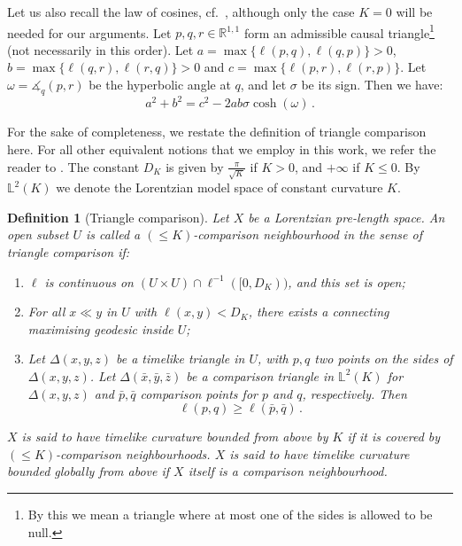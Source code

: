 \documentclass[hidelinks,12pt,a4paper]{article}
\numberwithin{equation}{section}
\theoremstyle{plain}
\newtheorem{definition}{Definition}[section]
\theoremstyle{definition}
\newcommand{\lm}[1]{\mathbb{L}^2(#1)}
\newcommand{\LpLSn}{Lo\-rentz\-ian pre-length space}
\newcommand{\ma}{\ensuremath{\measuredangle}}
\begin{document}
Let us also recall the law of cosines, cf.\ \cite[Lemma 2.4]{BS23}, although only the case $K=0$ will be needed for our arguments.  
Let $p, q, r \in \mathbb{R}^{1,1}$ form an admissible causal triangle\footnote{By this we mean a triangle where at most one of the sides is allowed to be null. } (not necessarily in this order). 
Let $a = \max\{\ell (p, q), \ell (q, p)\} > 0$, $b = \max\{\ell (q, r), \ell (r, q)\} > 0$ and $c = \max \{\ell (p, r), \ell (r, p)\}$. 
Let $\omega=\ma_q(p,r)$ be the hyperbolic angle at $q$, and let $\sigma$ be its sign. 
Then we have: 
\begin{equation}
\label{eq: LOC}
a^2 + b^2 = c^2 - 2ab\sigma \cosh(\omega) \, .
\end{equation}

For the sake of  completeness, we restate the definition of triangle comparison here. 
For all other equivalent notions that we employ in this work, we refer the reader to \cite{BKR24}. 
The constant $D_K$ is given by $\frac{\pi}{\sqrt{K}}$ if $K > 0$, and $+ \infty$ if $K \leq 0$. 
By $\lm{K}$ we denote the Lorentzian model space of constant curvature $K$.

\begin{definition}[Triangle comparison]
\label{def: triangle comparison}
Let $X$ be a \LpLSn. An open subset $U$ is called a $(\leq K)$-comparison neighbourhood in the sense of triangle comparison if:
\begin{enumerate}[label=(\roman*)]
\item $\ell$ is continuous on $(U\times U) \cap \ell^{-1}([0,D_K))$, and this set is open; 
\item For all $x \ll y$ in $U$ with $\ell(x,y)<D_K$, there exists a connecting maximising geodesic inside $U$;
\item Let $\Delta (x,y,z)$ be a timelike triangle in $U$, with $p,q$ two points on the sides of $\Delta (x,y,z)$. Let $\Delta(\bar{x}, \bar{y}, \bar{z})$ be a comparison triangle in $\lm{K}$ for $\Delta (x,y,z)$ and $\bar{p},\bar{q}$ comparison points for $p$ and $q$, respectively. Then 
\begin{equation}
\label{eq: timelike triangle comparison inequality}
\ell(p,q) \geq \ell(\bar{p}, \bar{q}) \, .
\end{equation}
\end{enumerate}
$X$ is said to have timelike curvature bounded from above by $K$ if it is covered by $(\leq K)$-comparison neighbourhoods. 
$X$ is said to have timelike curvature bounded globally from above if $X$ itself is a comparison neighbourhood. 
\end{definition}
\end{document}
